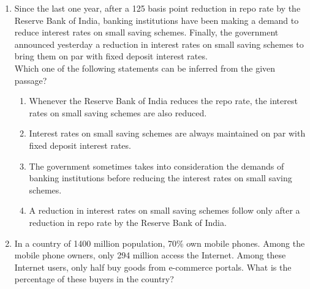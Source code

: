 \documentclass[journal]{IEEEtran}
\numberwithin{equation}{enumi}
\numberwithin{figure}{enumi}
\begin{document}
\begin{enumerate}
\bigskip




    \item Since the last one year, after a 125 basis point reduction in repo rate by the Reserve Bank of India, banking institutions have been making a demand to reduce interest rates on small saving schemes. Finally, the government announced yesterday a reduction in interest rates on small saving schemes to bring them on par with fixed deposit interest rates.\\
    Which one of the following statements can be inferred from the given passage?\\
    \begin{enumerate}
        \item Whenever the Reserve Bank of India reduces the repo rate, the interest rates on small saving schemes are also reduced.
        \item Interest rates on small saving schemes are always maintained on par with fixed deposit interest rates.
        \item The government sometimes takes into consideration the demands of banking institutions before reducing the interest rates on small saving schemes.
        \item A reduction in interest rates on small saving schemes follow only after a reduction in repo rate by the Reserve Bank of India.
    \end{enumerate}
    \bigskip

    \item In a country of 1400 million population, 70\% own mobile phones. Among the mobile phone owners, only 294 million access the Internet. Among these Internet users, only half buy goods from e-commerce portals. What is the percentage of these buyers in the country?\\
    \begin{enumerate}
    \end{enumerate}
    \bigskip


\end{enumerate}
\end{document}
